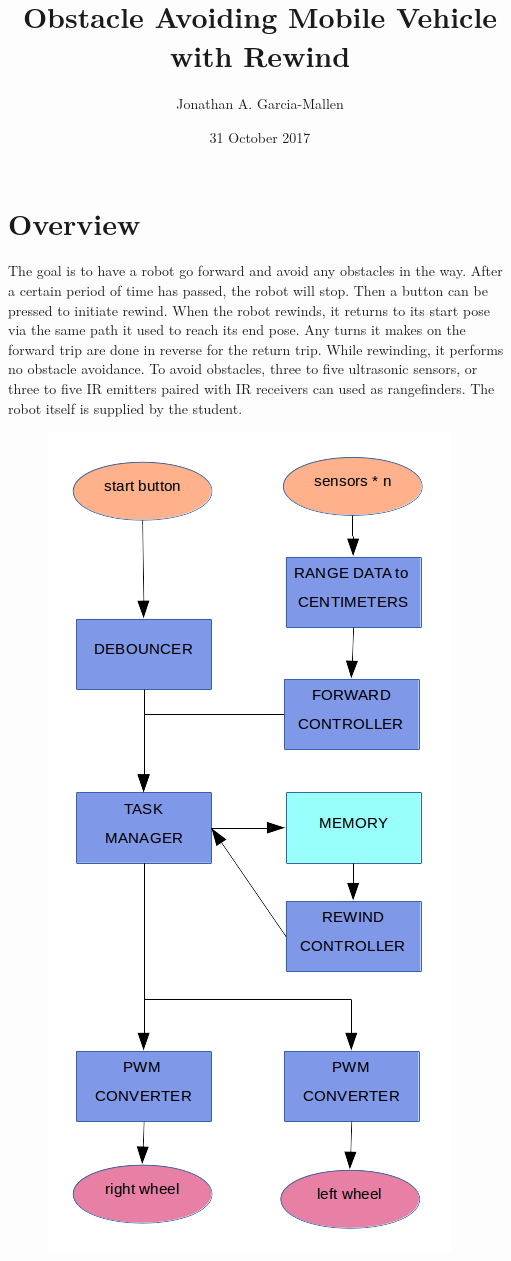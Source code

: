 \documentclass{article}
\title{Obstacle Avoiding Mobile Vehicle with Rewind}
\author{Jonathan A. Garcia-Mallen}
\date{31 October 2017}
\begin{document}
\maketitle

\section*{Overview} 
The goal is to have a robot go forward and avoid any obstacles in the way. After a certain period of time has passed, the robot will stop. Then a button can be pressed to initiate rewind. When the robot rewinds, it returns to its start pose via the same path it used to reach its end pose. Any turns it makes on the forward trip are done in reverse for the return trip. While rewinding, it performs no obstacle avoidance. To avoid obstacles, three to five ultrasonic sensors, or three to five IR emitters paired with IR receivers can used as rangefinders. The robot itself is supplied by the student.   


\begin{figure}
  \centering
  \includegraphics[width=.4\textwidth]{block_diagram.png}
\end{figure}
\end{document}
